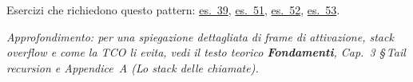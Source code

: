 \begin{tcolorbox}
\medskip
\textcolor{black!55}{\small
Esercizi che richiedono questo pattern:
\hyperref[ex:39]{es.~39},
\hyperref[ex:51]{es.~51},
\hyperref[ex:52]{es.~52},
\hyperref[ex:53]{es.~53}.}

\medskip\noindent
\small\textcolor{black!50}{\textit{Approfondimento:
per una spiegazione dettagliata di frame di attivazione, stack overflow
e come la TCO li evita, vedi il testo teorico
\textbf{Fondamenti}, Cap.~3 §\,Tail recursion e Appendice~A
(Lo stack delle chiamate).}}
\end{tcolorbox}







